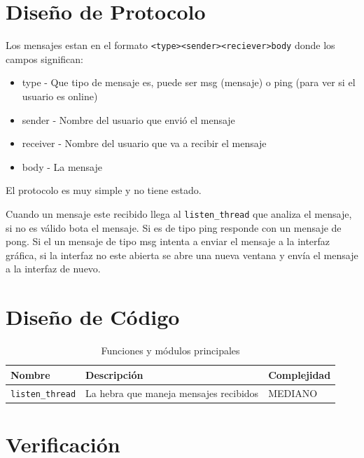 \documentclass[a4paper, 12pt]{article}
\begin{document}
\section{Diseño de Protocolo}
Los mensajes estan en el formato \texttt{<type><sender><reciever>body} donde los
campos significan:
\begin{itemize}
        \item type - Que tipo de mensaje es, puede ser msg (mensaje) o ping
                (para ver si el usuario es online)
        \item sender - Nombre del usuario que envió el mensaje
        \item receiver - Nombre del usuario que va a recibir el mensaje
        \item body - La mensaje
\end{itemize}

El protocolo es muy simple y no tiene estado.

Cuando un mensaje este recibido llega al \texttt{listen\_thread} que analiza el
mensaje, si no es válido bota el mensaje. Si es de tipo ping responde con un
mensaje de pong. Si el un mensaje de tipo msg intenta a enviar el mensaje a la
interfaz gráfica, si la interfaz no este abierta se abre una nueva ventana y
envía el mensaje a la interfaz de nuevo.

\section{Diseño de Código}
\begin{table}
        \centering
        \begin{tabular}{|p{3cm}|p{8cm}|p{25mm}|}
                \hline
                \textbf{Nombre} & \textbf{Descripción} & \textbf{Complejidad} \\
                \hline
                \texttt{listen\_thread} & La hebra que maneja mensajes recibidos
                & MEDIANO \\
                \hline
        \end{tabular}
        \caption{Funciones y módulos principales}
        \label{tab:func}
\end{table}

\section{Verificación}
\end{document}
